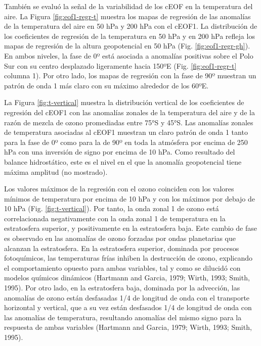 \documentclass[12pt,oneside]{reedthesis}
\begin{document}
También se evaluó la señal de la variabilidad de los cEOF en la temperatura del aire.
La Figura \ref{fig:eof1-regr-t} muestra los mapas de regresión de las anomalías de la temperatura del aire en 50 hPa y 200 hPa con el cEOF1.
La distribución de los coeficientes de regresión de la temperatura en 50 hPa y en 200 hPa refleja los mapas de regresión de la altura geopotencial en 50 hPa (Fig. \ref{fig:eof1-regr-gh}).
En ambos niveles, la fase de 0º está asociada a anomalías positivas sobre el Polo Sur con su centro desplazado ligeramente hacia 150ºE (Fig. \ref{fig:eof1-regr-t} columna 1).
Por otro lado, los mapas de regresión con la fase de 90º muestran un patrón de onda 1 más claro con su máximo alrededor de los 60ºE.

La Figura \ref{fig:t-vertical} muestra la distribución vertical de los coeficientes de regresión del cEOF1 con las anomalías zonales de la temperatura del aire y de la razón de mezcla de ozono promediadas entre 75°S y 45°S.
Las anomalías zonales de temperatura asociadas al cEOF1 muestran un claro patrón de onda 1 tanto para la fase de 0º como para la de 90º en toda la atmósfera por encima de 250 hPa con una inversión de signo por encima de 10 hPa.
Como resultado del balance hidrostático, este es el nivel en el que la anomalía geopotencial tiene máxima amplitud (no mostrado).

Los valores máximos de la regresión con el ozono coinciden con los valores mínimos de temperatura por encima de 10 hPa y con los máximos por debajo de 10 hPa (Fig. \ref{fig:t-vertical}).
Por tanto, la onda zonal 1 de ozono está correlacionada negativamente con la onda zonal 1 de temperatura en la estratosfera superior, y positivamente en la estratosfera baja.
Este cambio de fase es observado en las anomalías de ozono forzadas por ondas planetarias que alcanzan la estratosfera.
En la estratosfera superior, dominada por procesos fotoquímicos, las temperaturas frías inhiben la destrucción de ozono, explicando el comportamiento opuesto para ambas variables, tal y como se dilucidó con modelos químicos dinámicos (Hartmann and Garcia, 1979; Wirth, 1993; Smith, 1995).
Por otro lado, en la estratosfera baja, dominada por la advección, las anomalías de ozono están desfasadas 1/4 de longitud de onda con el transporte horizontal y vertical, que a su vez están desfasados 1/4 de longitud de onda con las anomalías de temperatura, resultando anomalías del mismo signo para la respuesta de ambas variables (Hartmann and Garcia, 1979; Wirth, 1993; Smith, 1995).
\end{document}
